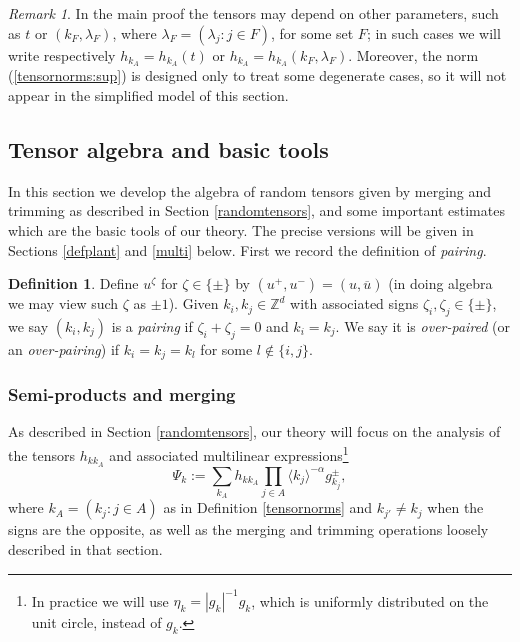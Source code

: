 \documentclass[11 pt,reqno]{amsart}
\theoremstyle{definition}
\newtheorem{df}[thm]{Definition}
\theoremstyle{remark}
\newtheorem{rem}[thm]{Remark}
\numberwithin{equation}{section}
\newcommand{\Zb}{\mathbb{Z}}
\begin{document}
 \begin{rem} In the main proof the tensors may depend on other parameters, such as $t$ or $(k_F,\lambda_F)$, where $\lambda_F=(\lambda_j:j\in F)$, for some set $F$; in such cases we will write respectively $h_{k_A}=h_{k_A}(t)$ or $h_{k_A}=h_{k_A}(k_F,\lambda_F)$. Moreover, the norm (\ref{tensornorms:sup}) is designed only to treat some degenerate cases, so it will not appear in the simplified model of this section.
 \end{rem}
 \subsection{Tensor algebra and basic tools}\label{tmintro} In this section we develop the algebra of random tensors given by merging and trimming as described in Section \ref{randomtensors}, and some important estimates which are the basic tools of our theory. The precise versions will be given in Sections \ref{defplant} and \ref{multi} below. First we record the definition of \emph{pairing}.
 \begin{df}\label{def:pairing}Define $u^\zeta$ for $\zeta\in\{\pm\}$ by $(u^+,u^-)=(u,\overline{u})$ (in doing algebra we may view such $\zeta$ as $\pm 1$). Given $k_i,k_j\in\Zb^d$ with associated signs $\zeta_i,\zeta_j\in\{\pm\}$, we say $(k_i,k_j)$ is a \emph{pairing} if $\zeta_i+\zeta_j=0$ and $k_i=k_j$. We say it is \emph{over-paired} (or an \emph{over-pairing}) if $k_i=k_j=k_l$ for some $l\not\in\{i,j\}$.
 \end{df}
 \subsubsection{Semi-products and merging}\label{semipro} As described in Section \ref{randomtensors}, our theory will focus on the  analysis of the tensors $h_{kk_A}$ and associated multilinear expressions\footnote{In practice we will use $\eta_k=|g_k|^{-1}g_k$, which is uniformly distributed on the unit circle, instead of $g_k$.}
 \begin{equation}\label{expressionintro}\Psi_k:=\sum_{k_A}h_{kk_A}\prod_{j\in A}\langle k_j\rangle^{-\alpha}g_{k_j}^{\pm},\end{equation} where $k_A=(k_j:j\in A)$ as in Definition \ref{tensornorms} and $k_{j'}\neq k_j$ when the signs are the opposite, as well as the merging and trimming operations loosely described in that section.
 
\end{document}
